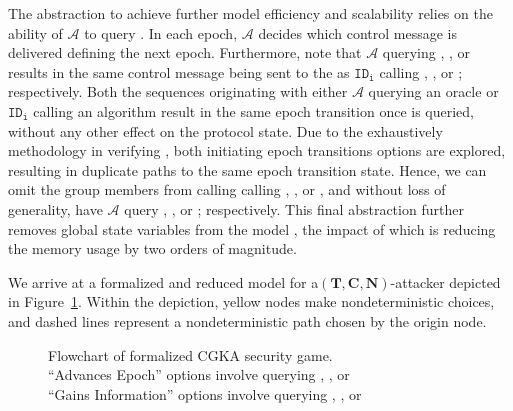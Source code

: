 The abstraction to achieve further model efficiency and scalability relies on the ability of \(\mathcal{A}\) to query .
In each epoch, \(\mathcal{A}\) decides which control message is delivered defining the next epoch.
Furthermore, note that \(\mathcal{A}\) querying , , or  results in the same control message being sent to the  as \(\mathtt{ID_i}\) calling , , or ; respectively.
Both the sequences originating with either \(\mathcal{A}\) querying an oracle or \(\mathtt{ID_i}\) calling an algorithm result in the same epoch transition once  is queried, without any other effect on the protocol state.
Due to the exhaustively methodology in verifying , both initiating epoch transitions options are explored, resulting in duplicate paths to the same epoch transition state.
Hence, we can omit the group members from calling calling , , or , and without loss of generality, have \(\mathcal{A}\) query , , or ; respectively.
This final abstraction further removes global state variables from the model , the impact of which is reducing the memory usage by two orders of magnitude.


We arrive at a formalized and reduced  model for a$( \textbf{T}, \textbf{C}, \textbf{N} )$-attacker depicted in Figure\ \ref{fig:CGKA-old-flowchart}.
Within the depiction, yellow nodes make nondeterministic choices, and dashed lines represent a nondeterministic path chosen by the origin node.
\begin{figure}
\centering
\caption[Flowchart of formalized CGKA security game.]{%
\label{fig:CGKA-old-flowchart}%
Flowchart of formalized CGKA security game.\\%
``Advances Epoch'' options involve querying , , or \\%
``Gains Information'' options involve querying , , or %
}
\end{figure}



